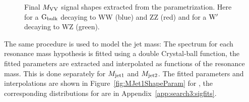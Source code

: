 \begin{figure}[htpb]
\centering
{}
\caption{Final $M_{\rm VV}$ signal shapes extracted from the parametrization. Here for a $\mathrm{G}_\mathrm{bulk}$ decaying to WW (blue) and ZZ (red) and for a $\mathrm{W}^\prime$ decaying to WZ (green).}
\label{fig:MVVfromjson}
\end{figure}
The same procedure is used to model the jet mass: The \MJO spectrum for each resonance mass hypothesis is fitted using a double Crystal-ball function, the fitted parameters are extracted and interpolated as functions of the resonance mass. 
This is done separately for $M_{\rm jet1}$ and $M_{\rm jet2}$. The fitted parameters and interpolations are shown in Figure~\ref{fig:MJet1ShapeParam} for \MJO, the corresponding distributions for \MJT are in Appendix~\ref{app:search3:sigfits}.
